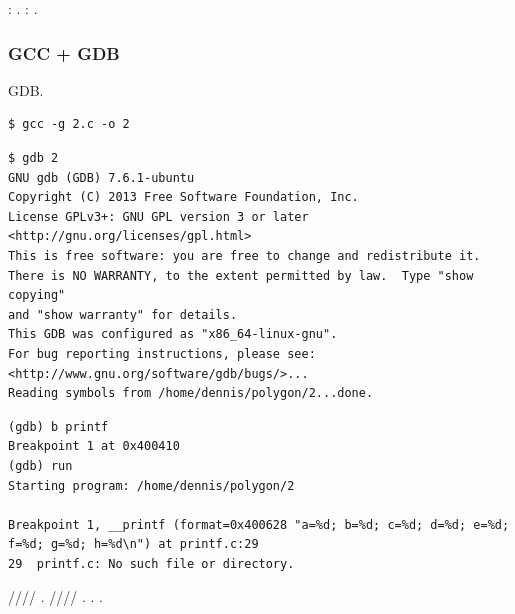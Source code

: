 %
: .
: .



\ifdefined\IncludeGDB
\subsubsection{GCC + GDB}

 \ac{GDB}.

\begin{lstlisting}
$ gcc -g 2.c -o 2
\end{lstlisting}

\begin{lstlisting}
$ gdb 2
GNU gdb (GDB) 7.6.1-ubuntu
Copyright (C) 2013 Free Software Foundation, Inc.
License GPLv3+: GNU GPL version 3 or later <http://gnu.org/licenses/gpl.html>
This is free software: you are free to change and redistribute it.
There is NO WARRANTY, to the extent permitted by law.  Type "show copying"
and "show warranty" for details.
This GDB was configured as "x86_64-linux-gnu".
For bug reporting instructions, please see:
<http://www.gnu.org/software/gdb/bugs/>...
Reading symbols from /home/dennis/polygon/2...done.
\end{lstlisting}

\begin{lstlisting}[caption=\RU{ставим точку останова на \printf{,} запускаем}\EN{let's set the breakpoint to \printf{,} and run}\ES{establezcamos el punto de interrupción en \printf{} y ejecutemos}]
(gdb) b printf
Breakpoint 1 at 0x400410
(gdb) run
Starting program: /home/dennis/polygon/2 

Breakpoint 1, __printf (format=0x400628 "a=%d; b=%d; c=%d; d=%d; e=%d; f=%d; g=%d; h=%d\n") at printf.c:29
29	printf.c: No such file or directory.
\end{lstlisting}

 \RSI/\RDX/\RCX// 
.
 \RSI/\RDX/\RCX// .
\RIP {} \printf{}.
 \printf.

